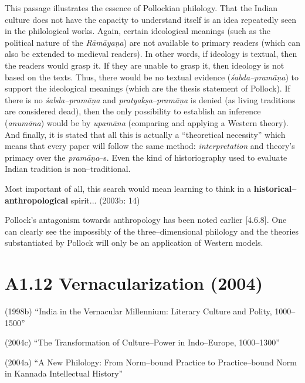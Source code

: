 This passage illustrates the essence of Pollockian philology. That the Indian culture does not have the capacity to understand itself is an idea repeatedly seen in the philological works. Again, certain ideological meanings (such as the political nature of the \textit{Rāmāyaṇa}) are not available to primary readers (which can also be extended to medieval readers). In other words, if ideology is textual, then the readers would grasp it. If they are unable to grasp it, then ideology is not based on the texts. Thus, there would be no textual evidence (\textit{śabda–pramāṇa}) to support the ideological meanings (which are the thesis statement of Pollock). If there is no \textit{śabda–pramāṇa} and \textit{pratyakṣa–pramāṇa} is denied (as living traditions are considered dead), then the only possibility to establish an inference (\textit{anumāna}) would be by \textit{upamāna} (comparing and applying a Western theory). And finally, it is stated that all this is actually a “theoretical necessity” which means that every paper will follow the same method: \textit{interpretation} and theory’s primacy over the \textit{pramāṇa}–s. Even the kind of historiography used to evaluate Indian tradition is non–traditional.

\begin{myquote}
Most important of all, this search would mean learning to think in a \textbf{historical–anthropological} spirit... (2003b: 14)
\end{myquote}

Pollock’s antagonism towards anthropology has been noted earlier [4.6.8]. One can clearly see the impossibly of the three–dimensional philology and the theories substantiated by Pollock will only be an application of Western models.

\vspace {-.4cm}

\section*{A1.12 Vernacularization (2004)}

(1998b) “India in the Vernacular Millennium: Literary Culture and Polity, 1000–1500”

(2004c) “The Transformation of Culture–Power in Indo–Europe, 1000–1300”

(2004a) “A New Philology: From Norm–bound Practice to Practice–bound Norm in Kannada Intellectual History”

